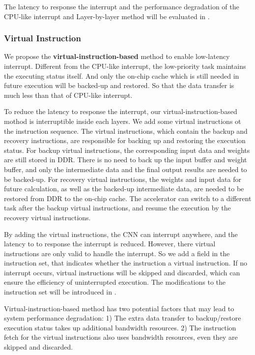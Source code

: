 The latency to response the interrupt and the performance degradation of the CPU-like interrupt and Layer-by-layer method will be evaluated in .

\subsubsection{Virtual Instruction}

We propose the \textbf{virtual-instruction-based} method to enable low-latency interrupt. Different from the CPU-like interrupt, the low-priority task maintains the executing status itself. And only the on-chip cache which is still needed in future execution will be backed-up and restored. So that the data transfer is much less than that of CPU-like interrupt.

To reduce the latency to response the interrupt, our virtual-instruction-based mothod is interruptible inside each layers. We add some virtual instructions ot the instruction sequence.
The virtual instructions, which contain the backup and recovery instructions, are responsible for backing up and restoring the execution status. 
For backup virtual instructions, the corresponding input data and weights are still stored in DDR. 
There is no need to back up the input buffer and weight buffer, and only the intermediate data and the final output results are needed to be backed-up. 
For recovery virtual instructions, the weights and input data for future calculation, as well as the backed-up intermediate data, are needed to be restored from DDR to the on-chip cache.
The accelerator can switch to a different task after the backup virtual instructions, and resume the execution by the recovery virtual instructions.

By adding the virtual instructions, the CNN can interrupt anywhere, and the latency to to response the interrupt is reduced. However, there virtual instructions are only valid to handle the interrupt. So we add a field in the instruction set, that indicates whether the instruction a virtual instruction. If no interrupt occurs, virtual instructions will be skipped and discarded, which can ensure the efficiency of uninterrupted execution. The modifications to the instruction set will be introduced in . 

Virtual-instruction-based method has two potential factors that may lead to system performance degradation: 1) The extra data transfer to backup/restore execution status takes up additional bandwidth resources. 2) The instruction fetch for the virtual instructions also uses bandwidth resources, even they are skipped and discarded.

